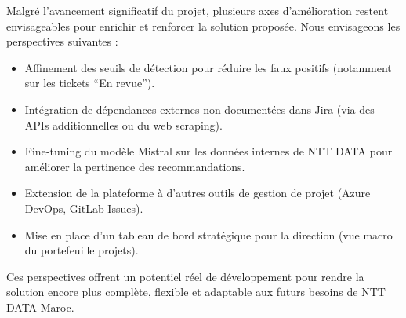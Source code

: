 Malgré l’avancement significatif du projet, plusieurs axes d’amélioration restent envisageables pour enrichir et renforcer la solution proposée. Nous envisageons les perspectives suivantes :

\begin{itemize}
    \item Affinement des seuils de détection pour réduire les faux positifs (notamment sur les tickets “En revue”).
    \item Intégration de dépendances externes non documentées dans Jira (via des APIs additionnelles ou du web scraping).
    \item Fine‑tuning du modèle Mistral sur les données internes de NTT DATA pour améliorer la pertinence des recommandations.
    \item Extension de la plateforme à d’autres outils de gestion de projet (Azure DevOps, GitLab Issues).
    \item Mise en place d’un tableau de bord stratégique pour la direction (vue macro du portefeuille projets).
\end{itemize}

Ces perspectives offrent un potentiel réel de développement pour rendre la solution encore plus complète, flexible et adaptable aux futurs besoins de NTT DATA Maroc.